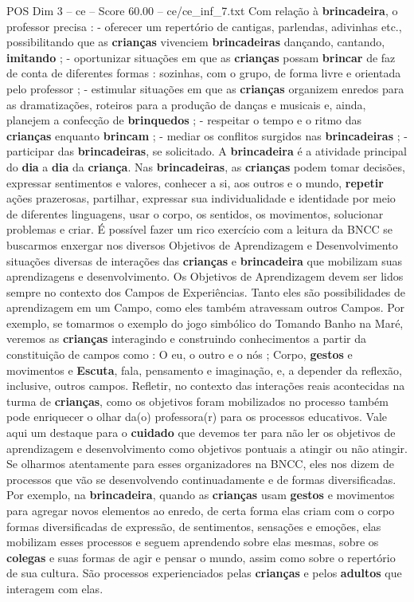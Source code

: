 \begin{textsample}{POS Dim 3 – ce – Score 60.00 – ce/ce\_inf\_7.txt}
Com relação à \textbf{brincadeira}, o professor precisa : - oferecer um repertório de cantigas, parlendas, adivinhas etc., possibilitando que as \textbf{crianças} vivenciem \textbf{brincadeiras} dançando, cantando, \textbf{imitando} ; - oportunizar situações em que as \textbf{crianças} possam \textbf{brincar} de faz de conta de diferentes formas : sozinhas, com o grupo, de forma livre e orientada pelo professor ; - estimular situações em que as \textbf{crianças} organizem enredos para as dramatizações, roteiros para a produção de danças e musicais e, ainda, planejem a confecção de \textbf{brinquedos} ; - respeitar o tempo e o ritmo das \textbf{crianças} enquanto \textbf{brincam} ; - mediar os conflitos surgidos nas \textbf{brincadeiras} ; - participar das \textbf{brincadeiras}, se solicitado.
A \textbf{brincadeira} é a atividade principal do \textbf{dia} a \textbf{dia} da \textbf{criança}.
Nas \textbf{brincadeiras}, as \textbf{crianças} podem tomar decisões, expressar sentimentos e valores, conhecer a si, aos outros e o mundo, \textbf{repetir} ações prazerosas, partilhar, expressar sua individualidade e identidade por meio de diferentes linguagens, usar o corpo, os sentidos, os movimentos, solucionar problemas e criar.
É possível fazer um rico exercício com a leitura da BNCC se buscarmos enxergar nos diversos Objetivos de Aprendizagem e Desenvolvimento situações diversas de interações das \textbf{crianças} e \textbf{brincadeira} que mobilizam suas aprendizagens e desenvolvimento.
Os Objetivos de Aprendizagem devem ser lidos sempre no contexto dos Campos de Experiências.
Tanto eles são possibilidades de aprendizagem em um Campo, como eles também atravessam outros Campos.
Por exemplo, se tomarmos o exemplo do jogo simbólico do Tomando Banho na Maré, veremos as \textbf{crianças} interagindo e construindo conhecimentos a partir da constituição de campos como : O eu, o outro e o nós ; Corpo, \textbf{gestos} e movimentos e \textbf{Escuta}, fala, pensamento e imaginação, e, a depender da reflexão, inclusive, outros campos.
Refletir, no contexto das interações reais acontecidas na turma de \textbf{crianças}, como os objetivos foram mobilizados no processo também pode enriquecer o olhar da(o) professora(r) para os processos educativos.
Vale aqui um destaque para o \textbf{cuidado} que devemos ter para não ler os objetivos de aprendizagem e desenvolvimento como objetivos pontuais a atingir ou não atingir.
Se olharmos atentamente para esses organizadores na BNCC, eles nos dizem de processos que vão se desenvolvendo continuadamente e de formas diversificadas.
Por exemplo, na \textbf{brincadeira}, quando as \textbf{crianças} usam \textbf{gestos} e movimentos para agregar novos elementos ao enredo, de certa forma elas criam com o corpo formas diversificadas de expressão, de sentimentos, sensações e emoções, elas mobilizam esses processos e seguem aprendendo sobre elas mesmas, sobre os \textbf{colegas} e suas formas de agir e pensar o mundo, assim como sobre o repertório de sua cultura.
São processos experienciados pelas \textbf{crianças} e pelos \textbf{adultos} que interagem com elas.


\end{textsample}
